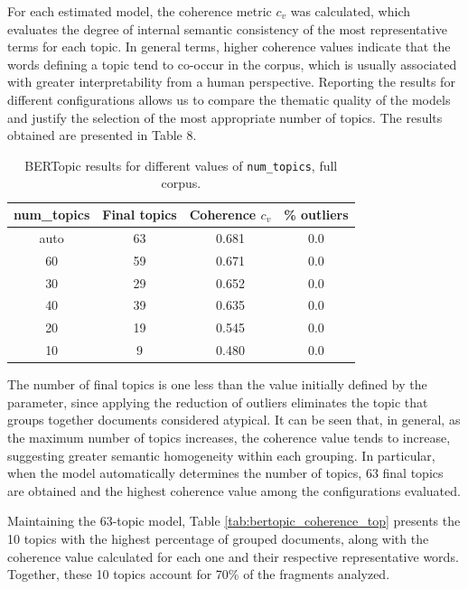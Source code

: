 \documentclass[pdflatex,sn-mathphys-num,iicol]{sn-jnl}
\begin{document}
	 For each estimated model, the coherence metric $c_v$ was calculated, which evaluates the
	 degree of internal semantic consistency of the most representative terms for each topic. In
	 general terms, higher coherence values indicate that the words defining a topic tend to co-occur
	 in the corpus, which is usually associated with greater interpretability from a human perspective.
	 Reporting the results for different configurations allows us to compare the thematic quality
	 of the models and justify the selection of the most appropriate number of topics. The results
	 obtained are presented in Table 8.
	 
	\begin{table}[h!]
		\caption{BERTopic results for different values of \texttt{num\_topics}, full corpus.}
		\label{tab:coherence_topics}
		\centering
		\footnotesize
		\begin{tabular}{@{}cccc@{}}
			\toprule
			\textbf{num\_topics} & \textbf{Final topics} & \textbf{Coherence $c_v$} & \textbf{\% outliers} \\
			\midrule
			auto & 63 & 0.681 & 0.0 \\
			60   & 59 & 0.671 & 0.0 \\
			30   & 29 & 0.652 & 0.0 \\
			40   & 39 & 0.635 & 0.0 \\
			20   & 19 & 0.545 & 0.0 \\
			10   & 9  & 0.480 & 0.0 \\
			\bottomrule
		\end{tabular}
	\end{table}
	
	The number of final topics is one less than the value initially defined by the parameter, since applying the reduction of outliers eliminates the topic that groups together documents considered atypical. It can be seen that, in general, as the maximum number of topics increases, the coherence value tends to increase, suggesting greater semantic homogeneity within each grouping. In particular, when the model automatically determines the number of topics, 63 final topics are obtained and the highest coherence value among the configurations evaluated.
	
	Maintaining the 63-topic model, Table \ref{tab:bertopic_coherence_top} presents the 10 topics with the highest percentage of grouped documents, along with the coherence value calculated for each one and their respective representative words. Together, these 10 topics account for 70\% of the fragments analyzed.
	
\end{document}
